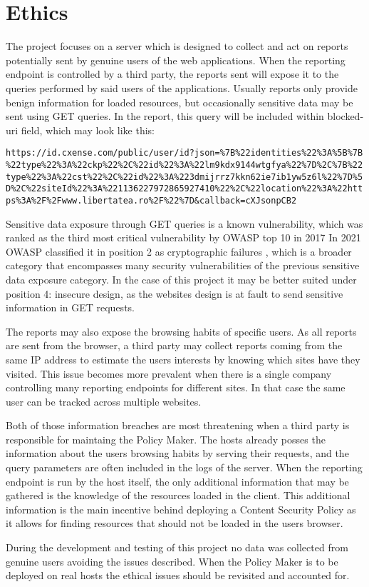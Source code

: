 \section{Ethics}
The project focuses on a server which is designed to collect and act on reports potentially sent by genuine users of the web applications. 
When the reporting endpoint is controlled by a third party, the reports sent will expose it to the queries performed by said users of the applications.
Usually reports only provide benign information for loaded resources, but occasionally sensitive data may be sent using GET queries.
In the report, this query will be included within blocked-uri field, which may look like this:
\begin{verbatim}
https://id.cxense.com/public/user/id?json=%7B%22identities%22%3A%5B%7B
%22type%22%3A%22ckp%22%2C%22id%22%3A%22lm9kdx9144wtgfya%22%7D%2C%7B%22
type%22%3A%22cst%22%2C%22id%22%3A%223dmijrrz7kkn62ie7ib1yw5z6l%22%7D%5
D%2C%22siteId%22%3A%221136227972865927410%22%2C%22location%22%3A%22htt
ps%3A%2F%2Fwww.libertatea.ro%2F%22%7D&callback=cXJsonpCB2
\end{verbatim}
Sensitive data exposure through GET queries is a known vulnerability, which was ranked as the third most critical vulnerability by OWASP top 10 in 2017 \cite{owaspTop102017}
In 2021 OWASP classified it in position 2 as cryptographic failures \cite{owaspTop10}, which is a broader category that encompasses many security vulnerabilities of the previous sensitive data exposure category. 
In the case of this project it may be better suited under position 4: insecure design, as the websites design is at fault to send sensitive information in GET requests. 

The reports may also expose the browsing habits of specific users. 
As all reports are sent from the browser, a third party may collect reports coming from the same IP address to estimate the users interests by knowing which sites have they visited. 
This issue becomes more prevalent when there is a single company controlling many reporting endpoints for different sites.
In that case the same user can be tracked across multiple websites.

Both of those information breaches are most threatening when a third party is responsible for maintaing the Policy Maker.
The hosts already posses the information about the users browsing habits by serving their requests, and the query parameters are often included in the logs of the server.
When the reporting endpoint is run by the host itself, the only additional information that may be gathered is the knowledge of the resources loaded in the client. 
This additional information is the main incentive behind deploying a Content Security Policy as it allows for finding resources that should not be loaded in the users browser.

During the development and testing of this project no data was collected from genuine users avoiding the issues described.
When the Policy Maker is to be deployed on real hosts the ethical issues should be revisited and accounted for.

